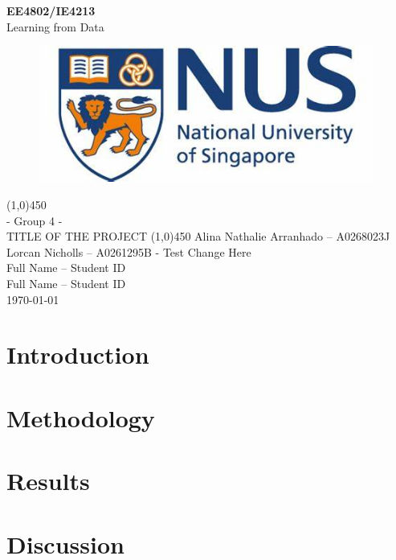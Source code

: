 \documentclass[11pt, a4paper]{article}
\begin{document}
\begin{titlepage}
\begin{center}
    \vspace*{1cm}
    \Large{\textbf{EE4802/IE4213}}\\[2mm]
    \Large{Learning from Data}
    \vfill
    \begin{figure}[http]
        \centering
        \includegraphics[width=11cm]{Figures/NUS_Logo.jpg}
    \end{figure}
    \vfill
    \line(1,0){450}\\[1mm]
    \Large{- Group 4 -\\ TITLE OF THE PROJECT}
    \line(1,0){450}
    \vfill
    Alina Nathalie Arranhado – A0268023J\\
    Lorcan Nicholls – A0261295B - Test Change Here\\
    Full Name – Student ID \\
    Full Name – Student ID\\
    \today \\
\end{center}
\end{titlepage}

\newpage

\section{Introduction}
\label{Sec: Introduction}


\section{Methodology}
\label{Sec: Methodology}


\section{Results}
\label{Sec: Results}


\section{Discussion}
\label{Sec: Discussion}


\newpage




% 
\end{document}
